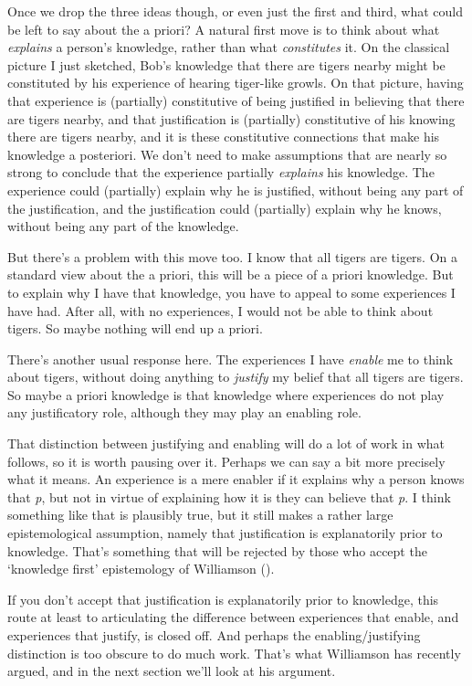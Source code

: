 \documentclass[
  11pt,
  letterpaper,
  DIV=11,
  numbers=noendperiod,
  twoside]{scrartcl}
\begin{document}
Once we drop the three ideas though, or even just the first and third,
what could be left to say about the a priori? A natural first move is to
think about what \emph{explains} a person's knowledge, rather than what
\emph{constitutes} it. On the classical picture I just sketched, Bob's
knowledge that there are tigers nearby might be constituted by his
experience of hearing tiger-like growls. On that picture, having that
experience is (partially) constitutive of being justified in believing
that there are tigers nearby, and that justification is (partially)
constitutive of his knowing there are tigers nearby, and it is these
constitutive connections that make his knowledge a posteriori. We don't
need to make assumptions that are nearly so strong to conclude that the
experience partially \emph{explains} his knowledge. The experience could
(partially) explain why he is justified, without being any part of the
justification, and the justification could (partially) explain why he
knows, without being any part of the knowledge.

But there's a problem with this move too. I know that all tigers are
tigers. On a standard view about the a priori, this will be a piece of a
priori knowledge. But to explain why I have that knowledge, you have to
appeal to some experiences I have had. After all, with no experiences, I
would not be able to think about tigers. So maybe nothing will end up a
priori.

There's another usual response here. The experiences I have
\emph{enable} me to think about tigers, without doing anything to
\emph{justify} my belief that all tigers are tigers. So maybe a priori
knowledge is that knowledge where experiences do not play any
justificatory role, although they may play an enabling role.

That distinction between justifying and enabling will do a lot of work
in what follows, so it is worth pausing over it. Perhaps we can say a
bit more precisely what it means. An experience is a mere enabler if it
explains why a person knows that \emph{p}, but not in virtue of
explaining how it is they can believe that \emph{p}. I think something
like that is plausibly true, but it still makes a rather large
epistemological assumption, namely that justification is explanatorily
prior to knowledge. That's something that will be rejected by those who
accept the `knowledge first' epistemology of Williamson
().

If you don't accept that justification is explanatorily prior to
knowledge, this route at least to articulating the difference between
experiences that enable, and experiences that justify, is closed off.
And perhaps the enabling/justifying distinction is too obscure to do
much work. That's what Williamson has recently argued, and in the next
section we'll look at his argument.
\end{document}
